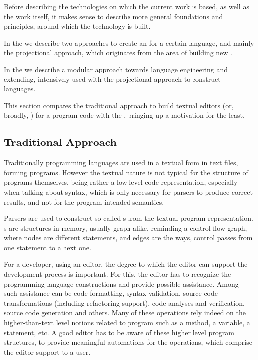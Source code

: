 
Before describing the technologies on which the current work is based, as well as the work itself,
it makes sense to describe more general foundations and principles, around which the technology is built.

In the  we describe two approaches to create an  for a certain language, and mainly the 
projectional approach, which originates from the area of building new .

In the  we describe a modular approach towards language engineering and extending, intensively
used with the projectional approach to construct languages.



This section compares the traditional approach to build textual editors (or, broadly, ) for a program code with
the , bringing up a motivation for the least.

\subsection{Traditional Approach}
Traditionally programming languages are used in a textual form in text files, forming programs.
However the textual nature is not typical for the structure of programs themselves, being rather a 
low-level code representation, especially when talking about syntax, which is only necessary for 
parsers to produce correct results, and not for the program intended semantics.


Parsers are used to construct so-called s from the textual 
program representation. s are structures in memory, usually graph-alike, 
reminding a control flow graph, where nodes are different statements, and edges are 
the ways, control passes from one statement to a next one.

For a developer, using an editor, the degree to which the editor can support the development
process is important. For this, the editor has to recognize the programming language constructions and provide possible assistance. Among such assistance can be code formatting, syntax validation,
source code transformations (including refactoring support), code analyses and verification, 
source code generation and others. Many of these operations rely indeed on the higher-than-text level notions
related to program such as a method, a variable, a statement, etc. 
A good editor has to be aware of these higher level program structures, to provide meaningful automations for the operations,
which comprise the editor support to a user.

